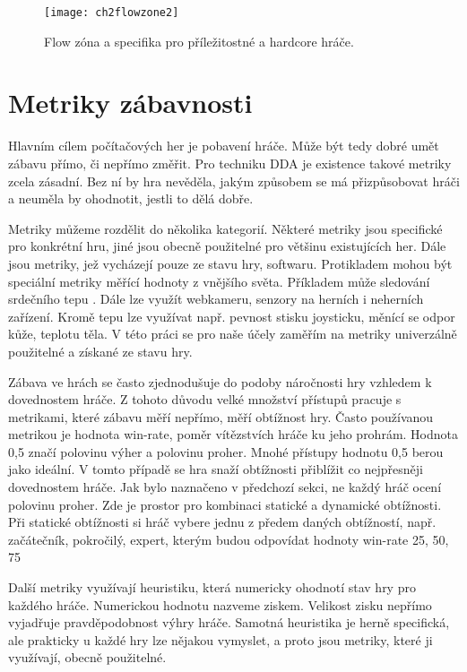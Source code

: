 \begin{figure}
  \centering
  \texttt{[image: ch2flowzone2]}
	\caption{Flow zóna a specifika pro příležitostné a hardcore hráče. \cite{thesisflow} }
	\label{fig:ch2flowzone2}
\end{figure}	

\section{Metriky zábavnosti} \label{sec:defzab}

Hlavním cílem počítačových her je pobavení hráče. Může být tedy dobré umět zábavu přímo, či nepřímo změřit. Pro techniku DDA je existence takové metriky zcela zásadní. Bez ní by hra nevěděla, jakým způsobem se má přizpůsobovat hráči a neuměla by ohodnotit, jestli to dělá dobře. 

Metriky můžeme rozdělit do několika kategorií. Některé metriky jsou specifické pro konkrétní hru, jiné jsou obecně použitelné pro většinu existujících her. Dále jsou metriky, jež vycházejí pouze ze stavu hry, softwaru. Protikladem mohou být speciální metriky měřící hodnoty z vnějšího světa. Příkladem může sledování srdečního tepu \cite{7}. Dále lze využít webkameru, senzory na herních i neherních zařízení. Kromě tepu lze využívat např. pevnost stisku joysticku, měnící se odpor kůže, teplotu těla.\cite{16Survey} V této práci se pro naše účely zaměřím na metriky univerzálně použitelné a získané ze stavu hry.

Zábava ve hrách se často zjednodušuje do podoby náročnosti hry vzhledem k dovednostem hráče. Z tohoto důvodu velké množství přístupů pracuje s metrikami, které zábavu měří nepřímo, měří obtížnost hry. Často používanou metrikou je hodnota win-rate, poměr vítězstvích hráče ku jeho prohrám. Hodnota 0,5 značí polovinu výher a polovinu proher. Mnohé přístupy hodnotu 0,5 berou jako ideální. V tomto případě se hra snaží obtížnosti přiblížit co nejpřesněji dovednostem hráče. Jak bylo naznačeno v předchozí sekci, ne každý hráč ocení polovinu proher. Zde je prostor pro kombinaci statické a dynamické obtížnosti. Při statické obtížnosti si hráč vybere jednu z předem daných obtížností, např. začátečník, pokročilý, expert, kterým budou odpovídat hodnoty win-rate 25, 50, 75 %

Další metriky využívají heuristiku, která numericky ohodnotí stav hry pro každého hráče. Numerickou hodnotu nazveme ziskem. Velikost zisku nepřímo vyjadřuje pravděpodobnost výhry hráče. Samotná heuristika je herně specifická, ale prakticky u každé hry lze nějakou vymyslet, a proto jsou metriky, které ji využívají, obecně použitelné. 

